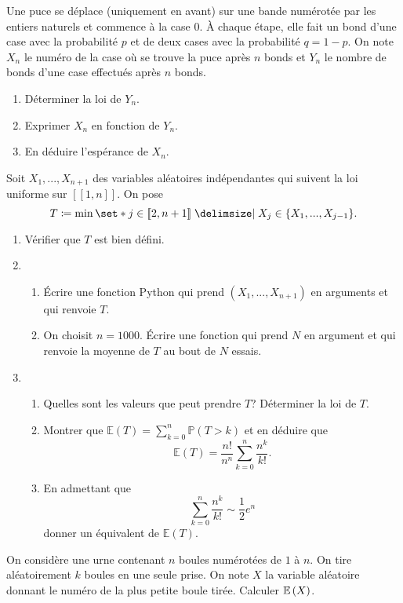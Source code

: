 \documentclass{magnolia}
\begin{document}
Une puce se déplace (uniquement en avant) sur une bande numérotée par les entiers naturels et commence à la case $0$. À chaque étape, elle fait un bond d'une case avec la probabilité $p$ et de deux cases avec la probabilité $q=1-p$.
On note $X_n$ le numéro de la case où se trouve la puce après $n$ bonds et $Y_n$ le nombre de bonds d'une case effectués après $n$ bonds.
\begin{enumerate}
\item Déterminer la loi de $Y_n$.
\item Exprimer $X_n$ en fonction de $Y_n$.
\item En déduire l'espérance de $X_n$.
\end{enumerate}

Soit $X_1, ... , X_{n+1}$ des variables aléatoires indépendantes qui suivent
la loi uniforme sur  $[\![1,n]\!]$.
On pose \[T\defeq\min \enstq{j\in [\![2,n+1]\!]}{X_j\in\{X_1,...,X_{j-1}\}}.\]
\begin{enumerate}
\item Vérifier que $T$ est bien défini.
\item %
\begin{enumerate}
\item \'Ecrire une fonction Python qui prend $(X_1,...,X_{n+1})$ en arguments 
et qui renvoie $T$.
\item  On choisit $n=1000$. \'Ecrire une fonction qui prend $N$ en argument 
et qui renvoie la moyenne de $T$ au bout de $N$ essais.
\end{enumerate}
\item
\begin{enumerate}
\item Quelles sont les valeurs que peut prendre $T$? 
Déterminer la loi de $T$.
\item Montrer que $\mathbb{E}(T)=\sum_{k=0}^n \mathbb{P}(T>k)$ et en déduire que
\[\mathbb{E}(T)=\frac{n!}{n^n}\sum_{k=0}^n \frac{n^k}{k!}.\]
\item 
En admettant que \[\sum_{k=0}^n \frac{n^k}{k!} \sim \frac{1}{2} e^n\] donner un équivalent de $\mathbb{E}(T)$.
\end{enumerate}
\end{enumerate}


On considère une urne contenant $n$ boules numérotées de $1$ à $n$. On tire aléatoirement $k$ boules en une seule prise. On note $X$ la variable aléatoire donnant le numéro de la plus petite boule tirée. Calculer $\mathbb{E} \left( X \right)$.
\end{document}

